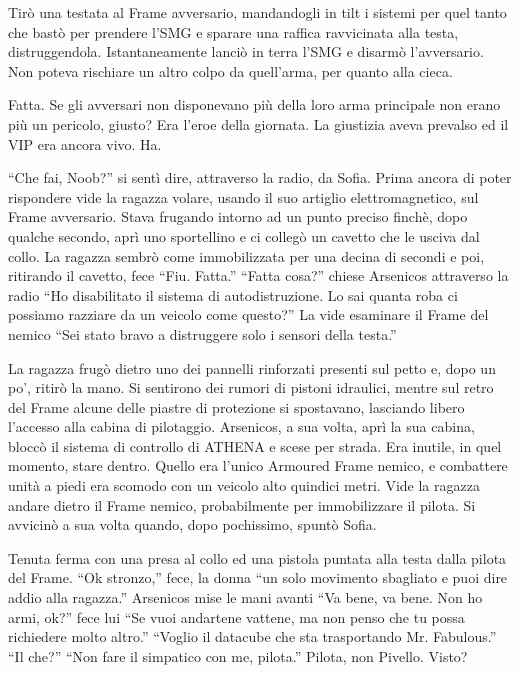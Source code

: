     Tirò una testata al Frame avversario, mandandogli in tilt i sistemi per quel tanto che bastò per prendere l'SMG e
    sparare una raffica ravvicinata alla testa, distruggendola. Istantaneamente lanciò in terra l'SMG e disarmò
    l'avversario. Non poteva rischiare un altro colpo da quell'arma, per quanto alla cieca.

    Fatta. Se gli avversari non disponevano più della loro arma principale non erano più un pericolo, giusto? Era l'eroe
    della giornata. La giustizia aveva prevalso ed il VIP era ancora vivo. Ha.

    ``Che fai, Noob?'' si sentì dire, attraverso la radio, da Sofia. Prima ancora di poter rispondere vide la ragazza
    volare, usando il suo artiglio elettromagnetico, sul Frame avversario. Stava frugando intorno ad un punto preciso
    finchè, dopo qualche secondo, aprì uno sportellino e ci collegò un cavetto che le usciva dal collo. La ragazza
    sembrò come immobilizzata per una decina di secondi e poi, ritirando il cavetto, fece ``Fiu. Fatta.'' ``Fatta
    cosa?'' chiese Arsenicos attraverso la radio ``Ho disabilitato il sistema di autodistruzione. Lo sai quanta roba ci
    possiamo razziare da un veicolo come questo?'' La vide esaminare il Frame del nemico ``Sei stato bravo a distruggere
    solo i sensori della testa.''

    La ragazza frugò dietro uno dei pannelli rinforzati presenti sul petto e, dopo un po', ritirò la mano. Si sentirono
    dei rumori di pistoni idraulici, mentre sul retro del Frame alcune delle piastre di protezione si spostavano,
    lasciando libero l'accesso alla cabina di pilotaggio. Arsenicos, a sua volta, aprì la sua cabina, bloccò il sistema
    di controllo di ATHENA e scese per strada. Era inutile, in quel momento, stare dentro. Quello era l'unico Armoured
    Frame nemico, e combattere unità a piedi era scomodo con un veicolo alto quindici metri. Vide la ragazza andare dietro
    il Frame nemico, probabilmente per immobilizzare il pilota. Si avvicinò a sua volta quando, dopo pochissimo, spuntò
    Sofia.

    Tenuta ferma con una presa al collo ed una pistola puntata alla testa dalla pilota del Frame. ``Ok stronzo,'' fece, la donna
    ``un solo movimento sbagliato e puoi dire addio alla ragazza.'' Arsenicos mise le mani avanti ``Va bene, va bene.
    Non ho armi, ok?'' fece lui ``Se vuoi andartene vattene, ma non penso che tu possa richiedere molto altro.''
    ``Voglio il datacube che sta trasportando Mr. Fabulous.'' ``Il che?'' ``Non fare il simpatico con me, pilota.''
    Pilota, non Pivello. Visto?

